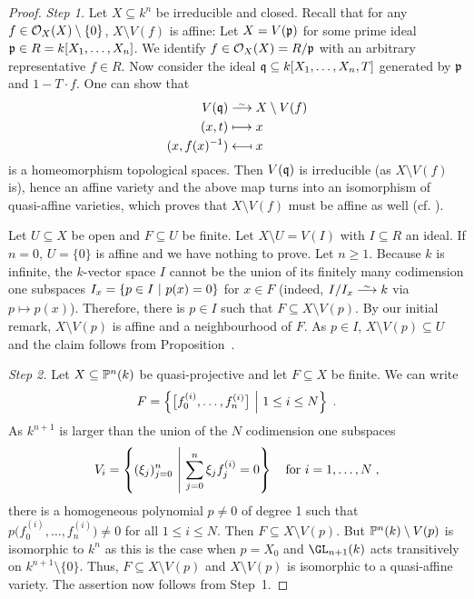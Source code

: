 \documentclass[a4paper,parskip=half,numbers=enddot, DIV=12]{scrreprt}
\begin{document}
\begin{proof}
	\emph{Step 1.} Let $X\subseteq k^n$ be irreducible and closed. Recall that for any $f\in \mathcal{O}_X(X)\setminus\{0\}$, $X\setminus V(f)$ is affine: Let $X=V(\mathfrak{p})$ for some prime ideal $\mathfrak{p}\in R=k[X_1,\ldots,X_n]$. We identify $f\in \mathcal{O}_X(X)=R/\mathfrak{p}$ with an arbitrary representative $f\in R$. Now consider the ideal $\mathfrak{q}\subseteq k[X_1,\ldots,X_n,T]$ generated by $\mathfrak{p}$ and $1-T\cdot f$. One can show that
	\begin{align*}
		V(\qq) &\isomorphism X\setminus V(f)\\
		(x,t) &\longmapsto x \\
		(x,f(x)^{-1}) &\longmapsfrom x
	\end{align*}
	is a homeomorphism topological spaces. Then $V(\mathfrak{q})$ is irreducible (as $X\setminus V(f)$ is), hence an affine variety and the above map turns into an isomorphism of quasi-affine varieties, which proves that $X\setminus V(f)$ must be affine as well (cf. \cite[Proposition~2.2.4]{alg1}).
	
	Let $U\subseteq X$ be open and $F\subseteq U$ be finite. Let $X\setminus U = V(I)$ with $I\subseteq R$ an ideal. If $n=0$, $U = \{0\}$ is affine and we have nothing to prove. Let $n\geq 1$. Because $k$ is infinite, the $k$-vector space $I$ cannot be the union of its finitely many codimension one subspaces $I_x=\left\{p\in I\ \middle|\  p(x) = 0\right\}$ for $x\in F$ (indeed, $I/I_x\isomorphism k$ via $p\mapsto p(x)$). Therefore, there is $p\in I$ such that $F\subseteq X\setminus V(p)$. By our initial remark, $X\setminus V(p)$ is affine and a neighbourhood of $F$. As $p\in I$, $X\setminus V(p)\subseteq U$ and the claim follows from Proposition~.
	
	\emph{Step 2.} Let $X\subseteq \mathbb{P}^n(k)$ be quasi-projective and let $F\subseteq X$ be finite. We can write 
	\begin{align*}
		F=\left\{\big[f_0^{(i)},\ldots, f_n^{(i)}\big]\ \middle|\  1\leq i \leq N\right\}\;.
	\end{align*} 
	As $k^{n+1}$ is larger than the union of the $N$ codimension one subspaces \begin{align*}
		V_i=\left\{(\xi_j)_{j=0}^n\ \middle|\  \sum_{j=0}^n \xi_j f_j^{(i)} = 0\right\}\quad\text{for }i=1,\ldots,N\;,
	\end{align*} 
	there is a homogeneous polynomial $p\neq 0$ of degree 1 such that $p\big(f_0^{(i)},\ldots, f_n^{(i)}\big) \neq 0$ for all $1\leq i\leq N$. Then $F\subseteq X\setminus V(p)$. But $\mathbb{P}^n(k)\setminus V(p)$ is isomorphic to $k^n$ as this is the case when $p= X_0$ and $\GL_{n+1}(k)$ acts transitively on $k^{n+1}\setminus\{0\}$. Thus, $F\subseteq X\setminus V(p)$ and $X\setminus V(p)$ is isomorphic to a quasi-affine variety. The assertion now follows from Step~1.
\end{proof}
\end{document}
